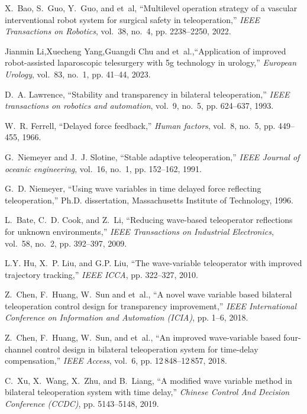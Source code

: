 \begin{thebibliography}{00}
     X.~Bao, S.~Guo, Y.~Guo, and et~al, ``Multilevel operation strategy of a vascular interventional robot system for surgical safety in teleoperation,'' \emph{IEEE Transactions on Robotics}, vol.~38, no.~4, pp. 2238--2250, 2022.

     Jianmin Li,Xuecheng Yang,Guangdi Chu and et~al.,``Application of improved robot-assisted laparoscopic telesurgery with 5g technology in urology,'' \emph{European Urology}, vol.~83, no.~1, pp. 41--44, 2023.

     D.~A. Lawrence, ``Stability and transparency in bilateral teleoperation,'' \emph{IEEE transactions on robotics and automation}, vol.~9, no.~5, pp. 624--637, 1993.

     W.~R. Ferrell, ``Delayed force feedback,'' \emph{Human factors}, vol.~8, no.~5, pp. 449--455, 1966.

     G.~Niemeyer and J.~J. Slotine, ``Stable adaptive teleoperation,'' \emph{IEEE Journal of oceanic engineering}, vol.~16, no.~1, pp. 152--162, 1991.

     G.~D. Niemeyer, ``Using wave variables in time delayed force reflecting teleoperation,'' Ph.D. dissertation, Massachusetts Institute of Technology, 1996.

     L.~Bate, C.~D. Cook, and Z.~Li, ``Reducing wave-based teleoperator reflections for unknown environments,'' \emph{IEEE Transactions on Industrial Electronics}, vol.~58, no.~2, pp. 392--397, 2009.

     L.Y. Hu, X.~P. Liu, and G.P. Liu, ``The wave-variable teleoperator with improved trajectory tracking,''  \emph{IEEE ICCA}, pp. 322--327, 2010.

     Z.~Chen, F.~Huang, W.~Sun and et~al., ``A novel wave variable based bilateral teleoperation control design for transparency improvement,''  \emph{IEEE International Conference on Information and Automation (ICIA)}, pp. 1--6, 2018.

     Z.~Chen, F.~Huang, W.~Sun, and et~al., ``An improved wave-variable based four-channel control design in bilateral teleoperation system for time-delay compensation,'' \emph{IEEE Access}, vol.~6, pp. 12\,848--12\,857, 2018.

     C.~Xu, X.~Wang, X.~Zhu, and B.~Liang, ``A modified wave variable method in bilateral teleoperation system with time delay,''  \emph{Chinese Control And Decision Conference (CCDC)}, pp. 5143--5148, 2019.


\end{thebibliography}

